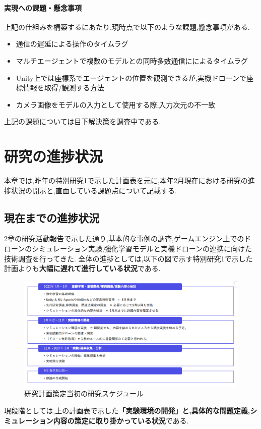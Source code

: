\documentclass{article}[jsarticle]
\begin{document}
\paragraph{実現への課題・懸念事項}
上記の仕組みを構築するにあたり,現時点で以下のような課題,懸念事項がある.
\begin{itemize}
    \item 通信の遅延による操作のタイムラグ
    \item マルチエージェントで複数のモデルとの同時多数通信にによるタイムラグ
    \item Unity上では座標系でエージェントの位置を観測できるが,実機ドローンで座標情報を取得/観測する方法
    \item カメラ画像をモデルの入力として使用する際,入力次元の不一致
\end{itemize}
上記の課題については目下解決策を調査中である.

\section{研究の進捗状況}
本章では,昨年の特別研究1で示した計画表を元に,本年2月現在における研究の進捗状況の開示と,直面している課題点について記載する.
\subsection{現在までの進捗状況}
2章の研究活動報告で示した通り,基本的な事例の調査,ゲームエンジン上でのドローンのシミュレーション実験,強化学習モデルと実機ドローンの連携に向けた技術調査を行ってきた.
全体の進捗としては,以下の図で示す特別研究1で示した計画よりも\textbf{大幅に遅れて進行している状況}である.
\begin{figure}[H]
    \centering
    \includegraphics[width=\textwidth]{./Images/20240203171846.png}
    \captionsetup{justification=centering}
    \caption{研究計画策定当初の研究スケジュール}
\end{figure}
現段階としては,上の計画表で示した\textbf{「実験環境の開発」と,具体的な問題定義,シミュレーション内容の策定に取り掛かっている状況}である.
\end{document}
